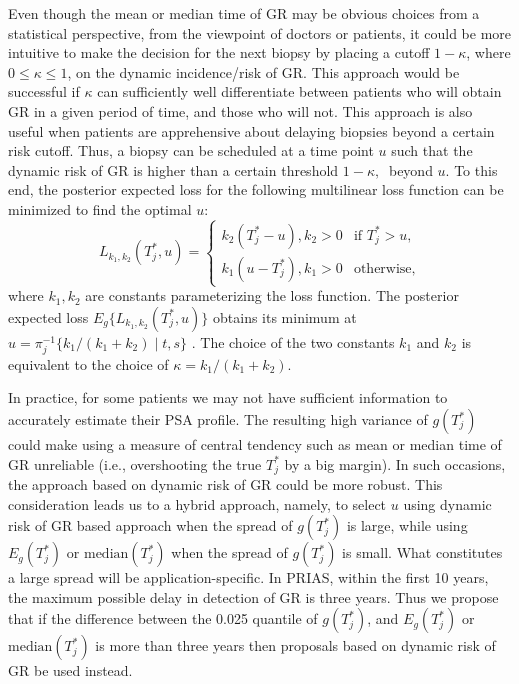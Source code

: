 Even though the mean or median time of GR may be obvious choices from a statistical perspective, from the viewpoint of doctors or patients, it could be more intuitive to make the decision for the next biopsy by placing a cutoff $1 - \kappa$, where $0 \leq \kappa \leq 1$, on the dynamic incidence/risk of GR. This approach would be successful if $\kappa$ can sufficiently well differentiate between patients who will obtain GR in a given period of time, and those who will not. This approach is also useful when patients are apprehensive about delaying biopsies beyond a certain risk cutoff. Thus, a biopsy can be scheduled at a time point $u$ such that the dynamic risk of GR is higher than a certain threshold $1 - \kappa,\ $ beyond $u$. To this end, the posterior expected loss for the following multilinear loss function can be minimized to find the optimal $u$:
\begin{equation*}
\label{eq : loss_dynamic_risk}
L_{k_1, k_2}(T^*_j, u) =
    \begin{cases}
      k_2(T^*_j-u), k_2>0 & \text{if } T^*_j > u,\\
      k_1(u-T^*_j), k_1>0 & \text{otherwise},
    \end{cases}       
\end{equation*}
where $k_1, k_2$ are constants parameterizing the loss function. The posterior expected loss $E_g\big\{L_{k_1, k_2}(T^*_j, u)\big\}$ obtains its minimum at $u = \pi_j^{-1}\big\{k_1/{(k_1 + k_2)} \mid t,s \big\}$ \citep{robertBayesianChoice}. The choice of the two constants $k_1$ and $k_2$ is equivalent to the choice of $\kappa = {k_1}/{(k_1 + k_2)}$.

In practice, for some patients we may not have sufficient information to accurately estimate their PSA profile. The resulting high variance of $g(T^*_j)$ could make using a measure of central tendency such as mean or median time of GR unreliable (i.e., overshooting the true $T_j^*$ by a big margin). In such occasions, the approach based on dynamic risk of GR could be more robust. This consideration leads us to a hybrid approach, namely, to select $u$ using dynamic risk of GR based approach when the spread of $g(T_j^*)$ is large, while using $E_g(T^*_j)$ or $\mbox{median}(T^*_j)$ when the spread of $g(T_j^*)$ is small. What constitutes a large spread will be application-specific. In PRIAS, within the first 10 years, the maximum possible delay in detection of GR is three years. Thus we propose that if the difference between the 0.025 quantile of $g(T^*_j)$, and $E_g(T^*_j)$ or $\mbox{median}(T^*_j)$ is more than three years then proposals based on dynamic risk of GR be used instead.